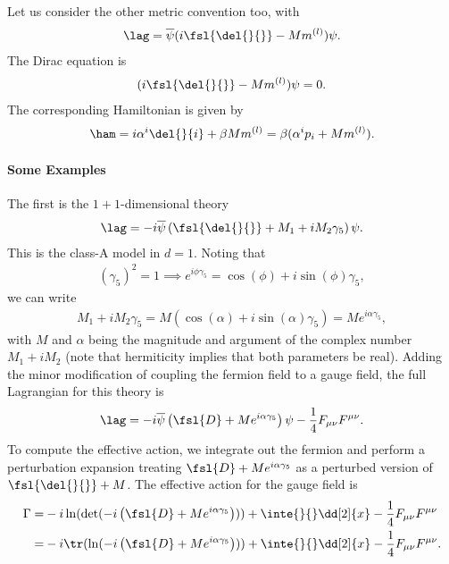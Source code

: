 Let us consider the other metric convention too, with
\begin{align*}
	\lag = \overline{\psi}(i\fsl{\del{}{}} - Mm^{(l)})\psi.
\end{align*}
The Dirac equation is
\begin{align*}
	(i\fsl{\del{}{}} - Mm^{(l)})\psi = 0.
\end{align*}
The corresponding Hamiltonian is given by
\begin{align*}
	\ham = i\alpha^{i}\del{}{i} + \beta Mm^{(l)} = \beta(\alpha^{i}p_{i} + Mm^{(l)}).
\end{align*}

\paragraph{Some Examples}
The first is the $1 + 1$-dimensional theory
\begin{align*}
	\lag = -i\overline{\psi}\left(\fsl{\del{}{}} + M_{1} + iM_{2}\gamma_{5}\right)\psi.
\end{align*}
This is the class-A model in $d = 1$. Noting that
\begin{align*}
	(\gamma_{5})^{2} = 1 \implies e^{i\phi\gamma_{5}} = \cos(\phi) + i\sin(\phi)\gamma_{5},
\end{align*}
we can write
\begin{align*}
	M_{1} + iM_{2}\gamma_{5} = M\left(\cos(\alpha) + i\sin(\alpha)\gamma_{5}\right) = Me^{i\alpha\gamma_{5}},
\end{align*}
with $M$ and $\alpha$ being the magnitude and argument of the complex number $M_{1} + iM_{2}$ (note that hermiticity implies that both parameters be real). Adding the minor modification of coupling the fermion field to a gauge field, the full Lagrangian for this theory is
\begin{align*}
	\lag = -i\overline{\psi}\left(\fsl{D} + Me^{i\alpha\gamma_{5}}\right)\psi - \frac{1}{4}F_{\mu\nu}F^{\mu\nu}.
\end{align*}
To compute the effective action, we integrate out the fermion and perform a perturbation expansion treating $\fsl{D} + Me^{i\alpha\gamma_{5}}$ as a perturbed version of $\fsl{\del{}{}} + M$. The effective action for the gauge field is
\begin{align*}
	\Gamma =& -i\ln(\det(-i\left(\fsl{D} + Me^{i\alpha\gamma_{5}}\right))) + \inte{}{}\dd[2]{x}-\frac{1}{4}F_{\mu\nu}F^{\mu\nu} \\
	       =& -i\tr(\ln(-i\left(\fsl{D} + Me^{i\alpha\gamma_{5}}\right))) + \inte{}{}\dd[2]{x}-\frac{1}{4}F_{\mu\nu}F^{\mu\nu}.
\end{align*}
